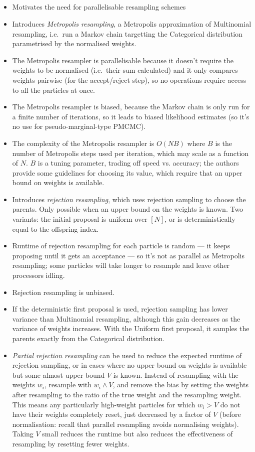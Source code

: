 \documentclass{article}
\begin{document}
\subsection*{\cite{murray2016}}
\begin{itemize}
\item Motivates the need for parallelisable resampling schemes
\item Introduces \emph{Metropolis resampling}, a Metropolis approximation of Multinomial resampling, i.e.\ run a Markov chain targetting the Categorical distribution parametrised by the normalised weights. 
\item The Metropolis resampler is parallelisable because it doesn't require the weights to be normalised (i.e.\ their sum calculated) and it only compares weights pairwise (for the accept/reject step), so no operations require access to all the particles at once.
\item The Metropolis resampler is biased, because the Markov chain is only run for a finite number of iterations, so it leads to biased likelihood estimates (so it's no use for pseudo-marginal-type PMCMC).
\item The complexity of the Metropolis resampler is $O(NB)$ where $B$ is the number of Metropolis steps used per iteration, which may scale as a function of $N$. $B$ is a tuning parameter, trading off speed vs. accuracy; the authors provide some guidelines for choosing its value, which require that an upper bound on weights is available.
\item Introduces \emph{rejection resampling}, which uses rejection sampling to choose the parents. Only possible when an upper bound on the weights is known. Two variants: the initial proposal is uniform over $[N]$, or is deterministically equal to the offspring index.
\item Runtime of rejection resampling for each particle is random --- it keeps proposing until it gets an acceptance --- so it's not as parallel as Metropolis resampling; some particles will take longer to resample and leave other processors idling.
\item Rejection resampling is unbiased.
\item If the deterministic first proposal is used, rejection sampling has lower variance than Multinomial resampling, although this gain decreases as the variance of weights increases. With the Uniform first proposal, it samples the parents exactly from the Categorical distribution.
\item \emph{Partial rejection resampling} can be used to reduce the expected runtime of rejection sampling, or in cases where no upper bound on weights is available but some almost-upper-bound $V$ is known. Instead of resampling with the weights $w_i$, resample with $w_i \wedge V$, and remove the bias by setting the weights after resampling to the ratio of the true weight and the resampling weight. This means any particularly high-weight particles for which $w_i > V$ do not have their weights completely reset, just decreased by a factor of $V$ (before normalisation: recall that parallel resampling avoids normalising weights). Taking $V$ small reduces the runtime but also reduces the effectiveness of resampling by resetting fewer weights.

\end{itemize}
\end{document}
